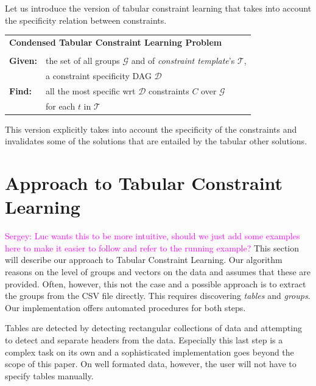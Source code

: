 \documentclass{ecai}
\newcommand{\sergey}[1]{\textcolor{magenta}{{\sc Sergey:} #1}\xspace}
\newcommand{\constraints}{\ensuremath{\mathcal{T}}\xspace}
\newcommand{\format}[1]{\textit{#1}\xspace}
\newcommand{\template}{\format{constraint template}}
\newcommand{\dependencies}{\ensuremath{\mathcal{D}}\xspace}
\newcommand{\groups}{\ensuremath{\mathcal{G}}\xspace}
\begin{document}
Let us introduce the version of tabular constraint learning that takes into account the specificity relation between constraints.

\begin{minipage}[c]{14em}
  \vspace{5pt}
  \begin{tabular}{ll}
    \multicolumn{2}{l}{{\textbf{Condensed Tabular Constraint Learning Problem}}}\\
    \vspace{-4pt}
    &\\
    \textbf{Given:}& the set of all groups $\groups$ and of \template's $\constraints$,\\
    & a constraint specificity DAG \dependencies \\
    \textbf{Find:}& all the most specific wrt \dependencies constraints $C$ over \groups\\
    & for each $t$ in \constraints \\
  \end{tabular}
  \vspace{6pt}
\end{minipage}

This version explicitly takes into account the specificity of the constraints and invalidates some of the solutions that are entailed by the tabular other solutions.

\newcommand{\tcl}{Tabular Constraint Learning}
\newcommand{\ctl}{Condensed Tabular Constraint Learning}
\section{Approach to Tabular Constraint Learning}
\sergey{Luc wants this to be more intuitive, should we just add some examples here to make it easier to follow and refer to the running example?}
This section will describe our approach to \tcl.
Our algorithm reasons on the level of groups and vectors on the data and assumes that these are provided.
Often, however, this not the case and a possible approach is to extract the groups from the CSV file directly.
This requires discovering \textit{tables} and \textit{groups}.
Our implementation offers automated procedures for both steps.

Tables are detected by detecting rectangular collections of data and attempting to detect and separate headers from the data.
Especially this last step is a complex task on its own  \cite{header} and a sophisticated implementation goes beyond the scope of this paper.
On well formated data, however, the user will not have to specify tables manually.
\end{document}
